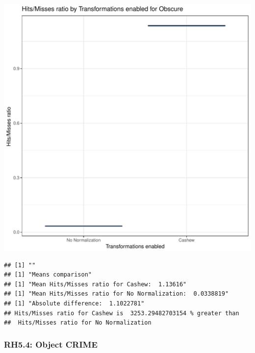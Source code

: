 \documentclass{article}\usepackage[]{graphicx}\usepackage[]{color}
\makeatletter
\def\maxwidth{ %
  \ifdim\Gin@nat@width>\linewidth
    \linewidth
  \else
    \Gin@nat@width
  \fi
}
\newenvironment{kframe}{%
 \def\at@end@of@kframe{}%
 \ifinner\ifhmode%
  \def\at@end@of@kframe{\end{minipage}}%
  \begin{minipage}{\columnwidth}%
 \fi\fi%
 \def\FrameCommand##1{\hskip\@totalleftmargin \hskip-\fboxsep
 \colorbox{shadecolor}{##1}\hskip-\fboxsep
     \hskip-\linewidth \hskip-\@totalleftmargin \hskip\columnwidth}%
 \MakeFramed {\advance\hsize-\width
   \@totalleftmargin\z@ \linewidth\hsize
   \@setminipage}}%
 {\par\unskip\endMakeFramed%
 \at@end@of@kframe}
\newenvironment{knitrout}{}{} %
\makeatother
\begin{document}
\begin{knitrout}
\color{fgcolor}
\includegraphics[width=\maxwidth]{figure/RH5_obscure-1} 
\begin{kframe}

{\ttfamily\noindent\bfseries\color{errorcolor}{\#\# Error in eval(expr, envir, enclos): object 'shap\_cashew\_obscure' not found}}\begin{verbatim}
## [1] ""
## [1] "Means comparison"
## [1] "Mean Hits/Misses ratio for Cashew:  1.13616"
## [1] "Mean Hits/Misses ratio for No Normalization:  0.0338819"
## [1] "Absolute difference:  1.1022781"
## Hits/Misses ratio for Cashew is  3253.29482703154 % greater than 
##  Hits/Misses ratio for No Normalization
\end{verbatim}
\end{kframe}
\end{knitrout}


\subsubsection{RH5.4: Object CRIME}
\end{document}
